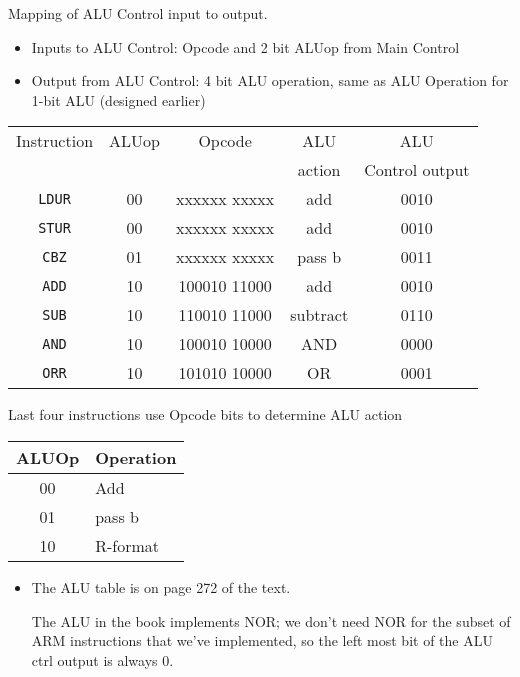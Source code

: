 \begin{frame}[fragile]
Mapping of ALU Control input to output. 
{\footnotesize
\begin{itemize}
    \item Inputs to ALU Control: Opcode and 2 bit ALUop from Main Control
    \item Output from ALU Control: 4 bit ALU operation, same as ALU Operation for 1-bit ALU {\tiny{(designed earlier) }}
\end{itemize}
}
{\footnotesize
	\begin{center}
	\begin{tabular}{|c|c|c|c|c|}\hline
	Instruction & ALUop & Opcode &  ALU
                       & ALU \\
	  &  &  &  action & Control output\\\hline
	 {\tt LDUR} & 00 & xxxxxx xxxxx & add & 0010 \\
	 {\tt STUR} & 00 & xxxxxx xxxxx & add & 0010 \\
	 {\tt CBZ} & 01 & xxxxxx xxxxx & pass b & 0011 \\
\hline
	 {\tt ADD} & 10 & 100010 11000 & add & 0010 \\
	 {\tt SUB} & 10 & 110010 11000 & subtract & 0110 \\
	 {\tt AND} & 10 & 100010 10000 & AND & 0000 \\
	 {\tt ORR} & 10 & 101010 10000 & OR & 0001 \\\hline
	\end{tabular}
	\end{center}
}
Last four instructions use Opcode bits to determine ALU action
{\footnotesize
	\begin{center}
		\SizeD
		\begin{tabular}{cl}
			ALUOp & Operation\\
			\hline
			00 & Add\\
			01 & pass b\\
			10 & R-format\\
		\end{tabular}
	\end{center}}
\BNotes\ifnum{}
\begin{itemize}
\item

	The ALU table is on page 272 of the text.

	The ALU in the book implements NOR; we don't need NOR for the
	subset of ARM instructions that we've implemented, so the
	left most bit of the ALU ctrl output is always 0.


\end{itemize}
\end{frame}
